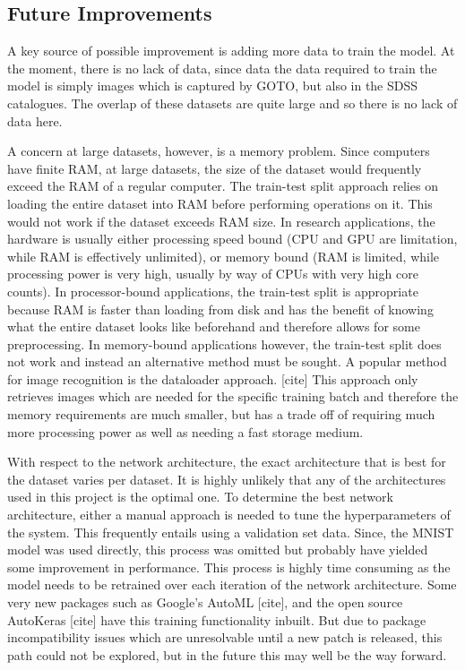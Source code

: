 \documentclass[a4paper,fleqn,usenatbib]{mnras}
\begin{document}
\subsection{Future Improvements}
A key source of possible improvement is adding more data to train the model. At the moment, there is no lack of data, since data the data required to train the model is simply images which is captured by GOTO, but also in the SDSS catalogues. The overlap of these datasets are quite large and so there is no lack of data here. 

A concern at large datasets, however, is a memory problem. Since computers have finite RAM, at large datasets, the size of the dataset would frequently exceed the RAM of a regular computer. The train-test split approach relies on loading the entire dataset into RAM before performing operations on it. This would not work if the dataset exceeds RAM size. In research applications, the hardware is usually either processing speed bound (CPU and GPU are limitation, while RAM is effectively unlimited), or memory bound (RAM is limited, while processing power is very high, usually by way of CPUs with very high core counts). In processor-bound applications, the train-test split is appropriate because RAM is faster than loading from disk and has the benefit of knowing what the entire dataset looks like beforehand and therefore allows for some preprocessing. In memory-bound applications however, the train-test split does not work and instead an alternative method must be sought. A popular method for image recognition is the dataloader approach. [cite] This approach only retrieves images which are needed for the specific training batch and therefore the memory requirements are much smaller, but has a trade off of requiring much more processing power as well as needing a fast storage medium. 

With respect to the network architecture, the exact architecture that is best for the dataset varies per dataset. It is highly unlikely that any of the architectures used in this project is the optimal one. To determine the best network architecture, either a manual approach is needed to tune the hyperparameters of the system. This frequently entails using a validation set data. Since, the MNIST model was used directly, this process was omitted but probably have yielded some improvement in performance. This process is highly time consuming as the model needs to be retrained over each iteration of the network architecture. Some very new packages such as Google's AutoML [cite], and the open source AutoKeras [cite] have this training functionality inbuilt. But due to package incompatibility issues which are unresolvable until a new patch is released, this path could not be explored, but in the future this may well be the way forward. 
\end{document}
